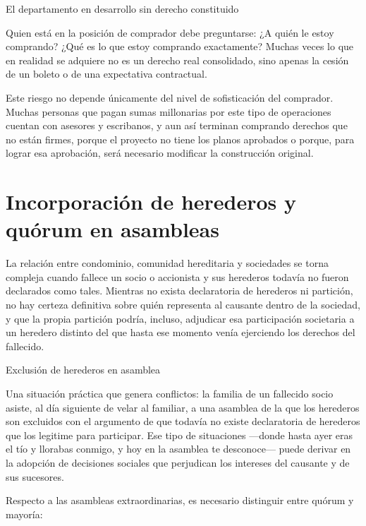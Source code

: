 \documentclass[12pt,oneside]{book}
\begin{document}
\begin{example}{El departamento en desarrollo sin derecho constituido}

Quien está en la posición de comprador debe preguntarse: ¿A quién le estoy comprando? ¿Qué es lo que estoy comprando exactamente? Muchas veces lo que en realidad se adquiere no es un derecho real consolidado, sino apenas la cesión de un boleto o de una expectativa contractual.

Este riesgo no depende únicamente del nivel de sofisticación del comprador. Muchas personas que pagan sumas millonarias por este tipo de operaciones cuentan con asesores y escribanos, y aun así terminan comprando derechos que no están firmes, porque el proyecto no tiene los planos aprobados o porque, para lograr esa aprobación, será necesario modificar la construcción original.

\end{example}

\section{Incorporación de herederos y quórum en asambleas}

La relación entre condominio, comunidad hereditaria y sociedades se torna compleja cuando fallece un socio o accionista y sus herederos todavía no fueron declarados como tales. Mientras no exista declaratoria de herederos ni partición, no hay certeza definitiva sobre quién representa al causante dentro de la sociedad, y que la propia partición podría, incluso, adjudicar esa participación societaria a un heredero distinto del que hasta ese momento venía ejerciendo los derechos del fallecido.

\begin{example}{Exclusión de herederos en asamblea}

Una situación práctica que genera conflictos: la familia de un fallecido socio asiste, al día siguiente de velar al familiar, a una asamblea de la que los herederos son excluidos con el argumento de que todavía no existe declaratoria de herederos que los legitime para participar. Ese tipo de situaciones ---donde hasta ayer eras el tío y llorabas conmigo, y hoy en la asamblea te desconoce--- puede derivar en la adopción de decisiones sociales que perjudican los intereses del causante y de sus sucesores.

\end{example}

Respecto a las asambleas extraordinarias, es necesario distinguir entre quórum y mayoría:
\end{document}
